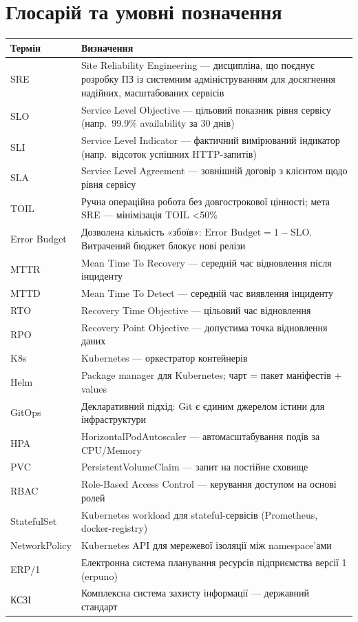 \documentclass[12pt,a4paper]{article}
\begin{document}
\newpage
\section{Глосарій та умовні позначення}

\begin{longtable}{L{3.5cm} L{10.5cm}}
\toprule
{}\color{primary}\textbf{Термін} & \color{primary}\textbf{Визначення} \\
\midrule\endhead\bottomrule\endfoot
SRE & Site Reliability Engineering --- дисципліна, що поєднує розробку ПЗ із системним адмініструванням для досягнення надійних, масштабованих сервісів \\[2pt]
SLO & Service Level Objective --- цільовий показник рівня сервісу (напр.\ 99.9\% availability за 30 днів) \\[2pt]
SLI & Service Level Indicator --- фактичний вимірюваний індикатор (напр.\ відсоток успішних HTTP-запитів) \\[2pt]
SLA & Service Level Agreement --- зовнішній договір з клієнтом щодо рівня сервісу \\[2pt]
TOIL & Ручна операційна робота без довгострокової цінності; мета SRE --- мінімізація TOIL \textless 50\% \\[2pt]
Error Budget & Дозволена кількість «збоїв»: $\text{Error Budget} = 1 - \text{SLO}$. Витрачений бюджет блокує нові релізи \\[2pt]
MTTR & Mean Time To Recovery --- середній час відновлення після інциденту \\[2pt]
MTTD & Mean Time To Detect --- середній час виявлення інциденту \\[2pt]
RTO & Recovery Time Objective --- цільовий час відновлення \\[2pt]
RPO & Recovery Point Objective --- допустима точка відновлення даних \\[2pt]
K8s & Kubernetes --- оркестратор контейнерів \\[2pt]
Helm & Package manager для Kubernetes; чарт = пакет маніфестів + values \\[2pt]
GitOps & Декларативний підхід: Git є єдиним джерелом істини для інфраструктури \\[2pt]
HPA & HorizontalPodAutoscaler --- автомасштабування подів за CPU/Memory \\[2pt]
PVC & PersistentVolumeClaim --- запит на постійне сховище \\[2pt]
RBAC & Role-Based Access Control --- керування доступом на основі ролей \\[2pt]
StatefulSet & Kubernetes workload для stateful-сервісів (Prometheus, docker-registry) \\[2pt]
NetworkPolicy & Kubernetes API для мережевої ізоляції між namespace'ами \\[2pt]
ERP/1 & Електронна система планування ресурсів підприємства версії 1 (erpuno) \\[2pt]
КСЗІ & Комплексна система захисту інформації --- державний стандарт \\[2pt]
\end{longtable}
\end{document}
